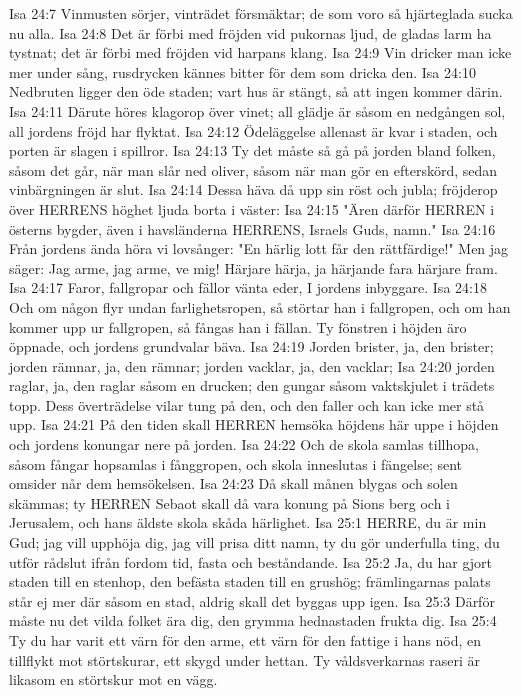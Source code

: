 Isa 24:7  Vinmusten sörjer, vinträdet försmäktar; de som voro så hjärteglada sucka nu alla.
Isa 24:8  Det är förbi med fröjden vid pukornas ljud, de gladas larm ha tystnat; det är förbi med fröjden vid harpans klang.
Isa 24:9  Vin dricker man icke mer under sång, rusdrycken kännes bitter för dem som dricka den.
Isa 24:10  Nedbruten ligger den öde staden; vart hus är stängt, så att ingen kommer därin.
Isa 24:11  Därute höres klagorop över vinet; all glädje är såsom en nedgången sol, all jordens fröjd har flyktat.
Isa 24:12  Ödeläggelse allenast är kvar i staden, och porten är slagen i spillror.
Isa 24:13  Ty det måste så gå på jorden bland folken, såsom det går, när man slår ned oliver, såsom när man gör en efterskörd, sedan vinbärgningen är slut.
Isa 24:14  Dessa häva då upp sin röst och jubla; fröjderop över HERRENS höghet ljuda borta i väster:
Isa 24:15  "Ären därför HERREN i österns bygder, även i havsländerna HERRENS, Israels Guds, namn."
Isa 24:16  Från jordens ända höra vi lovsånger: "En härlig lott får den rättfärdige!" Men jag säger: Jag arme, jag arme, ve mig! Härjare härja, ja härjande fara härjare fram.
Isa 24:17  Faror, fallgropar och fällor vänta eder, I jordens inbyggare.
Isa 24:18  Och om någon flyr undan farlighetsropen, så störtar han i fallgropen, och om han kommer upp ur fallgropen, så fångas han i fällan. Ty fönstren i höjden äro öppnade, och jordens grundvalar bäva.
Isa 24:19  Jorden brister, ja, den brister; jorden rämnar, ja, den rämnar; jorden vacklar, ja, den vacklar;
Isa 24:20  jorden raglar, ja, den raglar såsom en drucken; den gungar såsom vaktskjulet i trädets topp. Dess överträdelse vilar tung på den, och den faller och kan icke mer stå upp.
Isa 24:21  På den tiden skall HERREN hemsöka höjdens här uppe i höjden och jordens konungar nere på jorden.
Isa 24:22  Och de skola samlas tillhopa, såsom fångar hopsamlas i fånggropen, och skola inneslutas i fängelse; sent omsider når dem hemsökelsen.
Isa 24:23  Då skall månen blygas och solen skämmas; ty HERREN Sebaot skall då vara konung på Sions berg och i Jerusalem, och hans äldste skola skåda härlighet.
Isa 25:1  HERRE, du är min Gud; jag vill upphöja dig, jag vill prisa ditt namn, ty du gör underfulla ting, du utför rådslut ifrån fordom tid, fasta och beståndande.
Isa 25:2  Ja, du har gjort staden till en stenhop, den befästa staden till en grushög; främlingarnas palats står ej mer där såsom en stad, aldrig skall det byggas upp igen.
Isa 25:3  Därför måste nu det vilda folket ära dig, den grymma hednastaden frukta dig.
Isa 25:4  Ty du har varit ett värn för den arme, ett värn för den fattige i hans nöd, en tillflykt mot störtskurar, ett skygd under hettan. Ty våldsverkarnas raseri är likasom en störtskur mot en vägg.
